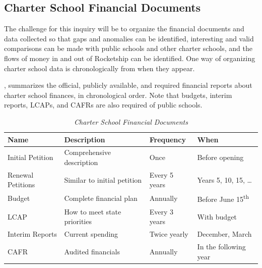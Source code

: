 \subsection{Charter School Financial Documents}\label{sec:charter-financial-docs}\indent%

The challenge for this inquiry will be to organize the financial documents and data collected so that gaps and anomalies can be identified, interesting and valid comparisons can be made with public schools and other charter schools, and the flows of money in and out of Rocketship can be identified. One way of organizing charter school data is chronologically from when they appear.

, summarizes the official, publicly available, and required financial reports about charter school finances, in chronological order. Note that budgets, interim reports, LCAPs, and CAFRs are also required of public schools. 

\begin{table}[ht]
  \centering\small%
  \caption[Charter School Financial Documents]{\textit{Charter School Financial Documents}}\label{tab:charter-fin-docs}%
  \begin{tabular}{llll}
    \toprule%
    \textbf{Name}  & \textbf{Description} & \textbf{Frequency} & \textbf{When} \\
    \midrule%
    Initial Petition  & Comprehensive description    & Once           & Before opening \\
    Renewal Petitions & Similar to initial petition  & Every 5 years  & Years 5, 10, 15, \ldots \\
    Budget            & Complete financial plan      & Annually       & Before June 15\textsuperscript{th} \\
    LCAP              & How to meet state priorities & Every 3 years  & With budget\\
    Interim Reports   & Current spending             & Twice yearly   & December, March \\
    CAFR              & Audited financials           & Annually       & In the following year \\
    \bottomrule%
  \end{tabular}
\end{table}%
%
%
%
%
%

